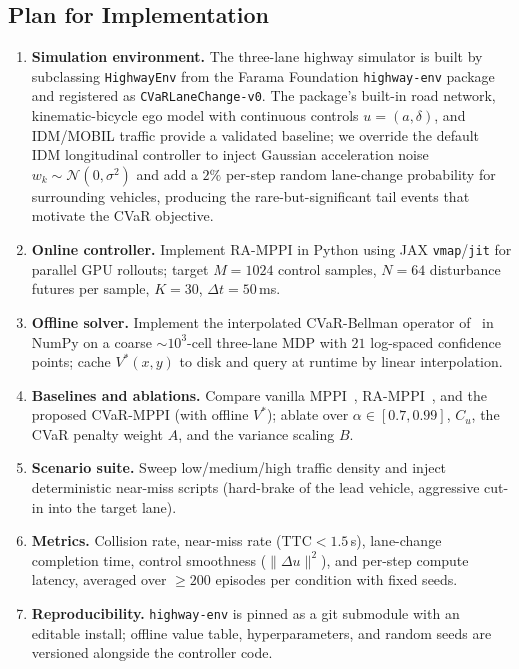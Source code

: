 \documentclass[letterpaper, 10 pt, conference]{ieeeconf}  %
\begin{document}
\subsection{Plan for Implementation}
\begin{enumerate}
\item \textbf{Simulation environment.} The three-lane highway simulator is built by subclassing \texttt{HighwayEnv} from the Farama Foundation \texttt{highway-env} package~\cite{highwayenv} and registered as \texttt{CVaRLaneChange-v0}. The package's built-in road network, kinematic-bicycle ego model with continuous controls $u\!=\!(a,\delta)$, and IDM/MOBIL traffic provide a validated baseline; we override the default IDM longitudinal controller to inject Gaussian acceleration noise $w_k\!\sim\!\mathcal{N}(0,\sigma^{2})$ and add a $2\%$ per-step random lane-change probability for surrounding vehicles, producing the rare-but-significant tail events that motivate the CVaR objective.
\item \textbf{Online controller.} Implement RA-MPPI in Python using JAX \texttt{vmap}/\texttt{jit} for parallel GPU rollouts; target $M\!=\!1024$ control samples, $N\!=\!64$ disturbance futures per sample, $K\!=\!30$, $\Delta t\!=\!50$\,ms.
\item \textbf{Offline solver.} Implement the interpolated CVaR-Bellman operator of~\cite{chow_cvarmdp} in NumPy on a coarse $\sim\!10^{3}$-cell three-lane MDP with $21$ log-spaced confidence points; cache $V^{*}(x,y)$ to disk and query at runtime by linear interpolation.
\item \textbf{Baselines and ablations.} Compare vanilla MPPI~\cite{mppi}, RA-MPPI~\cite{ramppi}, and the proposed CVaR-MPPI (with offline $V^{*}$); ablate over $\alpha\!\in\![0.7,0.99]$, $C_u$, the CVaR penalty weight $A$, and the variance scaling $B$.
\item \textbf{Scenario suite.} Sweep low/medium/high traffic density and inject deterministic near-miss scripts (hard-brake of the lead vehicle, aggressive cut-in into the target lane).
\item \textbf{Metrics.} Collision rate, near-miss rate (TTC$<\!1.5$\,s), lane-change completion time, control smoothness ($\|\Delta u\|^{2}$), and per-step compute latency, averaged over $\ge\!200$ episodes per condition with fixed seeds.
\item \textbf{Reproducibility.} \texttt{highway-env} is pinned as a git submodule with an editable install; offline value table, hyperparameters, and random seeds are versioned alongside the controller code.
\end{enumerate}
\end{document}
